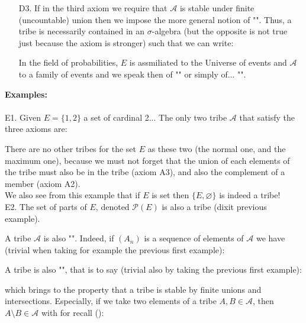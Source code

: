 \begin{enumerate}
	\item[D3.] If in the third axiom we require that $\mathcal{A}$ is stable under finite (uncountable) union then we impose the more general notion of "\label{sigma algebra}". Thus, a tribe is necessarily contained in an $\sigma$-algebra (but the opposite is not true just because the axiom is stronger) such that we can write:
	
	\begin{tcolorbox}[title=Remark,colframe=black,arc=10pt]
	In the field of probabilities, $E$ is assmiliated to the Universe of events and $\mathcal{A}$ to a family of events and we speak then of "" or simply of... "".
	\end{tcolorbox}	
	\end{enumerate}
	\begin{tcolorbox}[colframe=black,colback=white,sharp corners]
	\textbf{{\Large {}}Examples:}\\\\
	E1. Given $E=\{1,2\}$ a set of cardinal 2... The only two tribe $\mathcal{A}$ that satisfy the three axioms are:
	
	There are no other tribes for the set $E$ as these two (the normal one, and the maximum one), because we must not forget that the union of each elements of the tribe must also be in the tribe (axiom A3), and also the complement of a member (axiom A2).\\
	
	We also see from this example that if $E$ is set then $\{E,\varnothing\}$ is indeed a tribe!\\
	
	E2. The set of parts of $E$, denoted $\mathcal{P}(E)$ is also a tribe (dixit previous example).
	\end{tcolorbox}
	A tribe $\mathcal{A}$ is also "". Indeed, if $(A_n)$ is a sequence of elements of $\mathcal{A}$ we have (trivial when taking for example the previous first example):
	
	A tribe is also "", that is to say (trivial also by taking the previous first example):
	
	which brings to the property that a tribe is stable by finite unions and intersections. Especially, if we take two elements of a tribe $A,B\in \mathcal{A}$, then $A\setminus B\in \mathcal{A}$ with for recall ():
	
